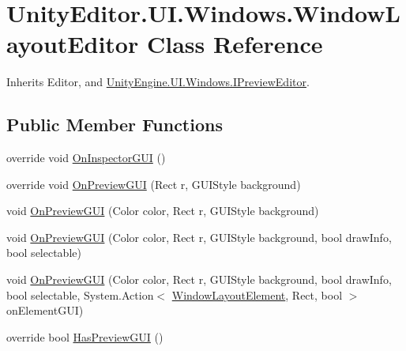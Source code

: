 \hypertarget{class_unity_editor_1_1_u_i_1_1_windows_1_1_window_layout_editor}{}\section{Unity\+Editor.\+U\+I.\+Windows.\+Window\+Layout\+Editor Class Reference}
\label{class_unity_editor_1_1_u_i_1_1_windows_1_1_window_layout_editor}


Inherits Editor, and \hyperlink{interface_unity_engine_1_1_u_i_1_1_windows_1_1_i_preview_editor}{Unity\+Engine.\+U\+I.\+Windows.\+I\+Preview\+Editor}.

\subsection*{Public Member Functions}
\begin{DoxyCompactItemize}
\item 
override void \hyperlink{class_unity_editor_1_1_u_i_1_1_windows_1_1_window_layout_editor_af603a1ff988cd0d0c645d335adb32df6}{On\+Inspector\+G\+U\+I} ()
\item 
override void \hyperlink{class_unity_editor_1_1_u_i_1_1_windows_1_1_window_layout_editor_ae360374e572a26758b412323b3ed38de}{On\+Preview\+G\+U\+I} (Rect r, G\+U\+I\+Style background)
\item 
void \hyperlink{class_unity_editor_1_1_u_i_1_1_windows_1_1_window_layout_editor_a149f8dac1c63a4854fb87ac5d5b06560}{On\+Preview\+G\+U\+I} (Color color, Rect r, G\+U\+I\+Style background)
\item 
void \hyperlink{class_unity_editor_1_1_u_i_1_1_windows_1_1_window_layout_editor_a97a9f4c8694e724723cfc0060303338e}{On\+Preview\+G\+U\+I} (Color color, Rect r, G\+U\+I\+Style background, bool draw\+Info, bool selectable)
\item 
void \hyperlink{class_unity_editor_1_1_u_i_1_1_windows_1_1_window_layout_editor_a11468ab6a3e8594078e5573be08d54d7}{On\+Preview\+G\+U\+I} (Color color, Rect r, G\+U\+I\+Style background, bool draw\+Info, bool selectable, System.\+Action$<$ \hyperlink{class_unity_engine_1_1_u_i_1_1_windows_1_1_window_layout_element}{Window\+Layout\+Element}, Rect, bool $>$ on\+Element\+G\+U\+I)
\item 
override bool \hyperlink{class_unity_editor_1_1_u_i_1_1_windows_1_1_window_layout_editor_ad9d8f4acf6c23552095552aa8dd159ed}{Has\+Preview\+G\+U\+I} ()
\end{DoxyCompactItemize}


